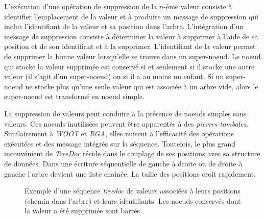 L'exécution d'une opération de suppression de la $n$-ème valeur consiste à identifier l'emplacement de la valeur et à produire un message de suppression qui inclut l'identifiant de la valeur et sa position dans l'arbre.
L'intégration d'un message de suppression consiste à déterminer la valeur à supprimer à l'aide de sa position et de son identifiant et à la supprimer.
L'identifiant de la valeur permet de supprimer la bonne valeur lorsqu'elle se trouve dans un super-noeud.
Le noeud qui stocke la valeur supprimée est conservé si et seulement si il stocke une autre valeur (il s'agit d'un super-noeud) ou si il a au moins un enfant.
Si un super-noeud ne stocke plus qu'une seule valeur qui est associée à un arbre vide, alors le super-noeud est transformé en noeud simple.

La suppression de valeurs peut conduire à la présence de noeuds simples sans valeurs.
Ces noeuds inutilisées peuvent être apparentés à des \emph{pierres tombales}.
Similairement à \emph{WOOT} et \emph{RGA}, elles nuisent à l'efficacité des opérations exécutées et des message intégrés sur la séquence.
Toutefois, le plus grand inconvénient de \emph{TreeDoc} réside dans le couplage de ses positions avec sa structure de données.
Dans une écriture séquentielle de gauche à droite ou de droite à gauche l'arbre devient une liste chaînée.
La taille des positions croit rapidement.

\begin{figure}[tb]
\centering
{}
\caption[Exemple d'une séquence \emph{treedoc}]{Exemple d'une séquence \emph{treedoc} de valeurs associées à leurs positions (chemin dans l'arbre) et leurs identifiants.
Les noeuds conservés dont la valeur a été supprimée sont barrés.}
\label{fig:treedoc}
\end{figure}

